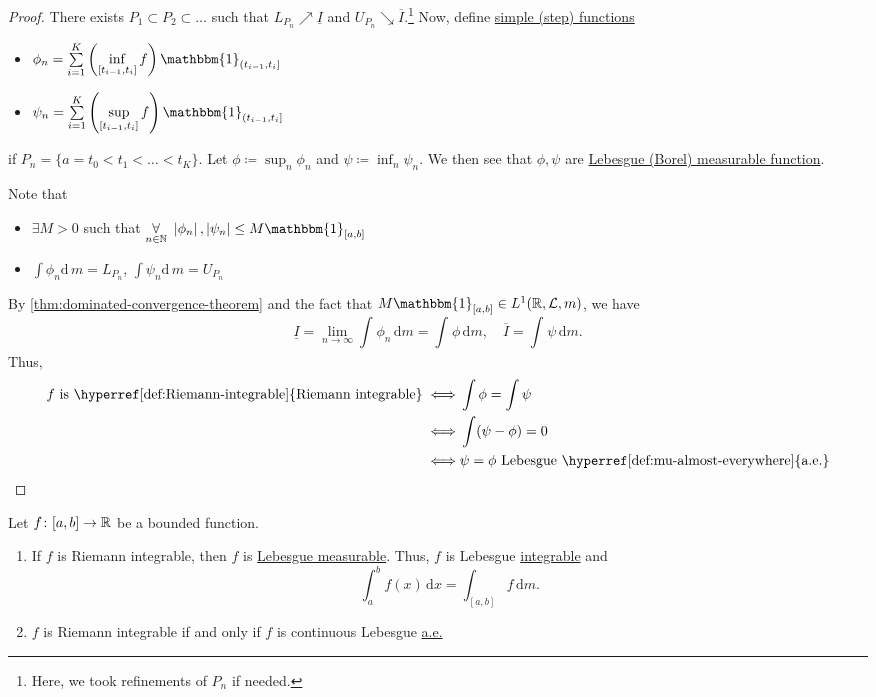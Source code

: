 \begin{proof}
	There exists \(P_1\subset P_2\subset \ldots  \) such that \(L_{P_{n}}\nearrow \underline{I} \) and \(U_{P_{n}}\searrow \overline{I} \).\footnote{Here, we took refinements of \(P_{n}\) if needed.}
	Now, define \hyperref[def:simple-function]{simple (step) functions}
	\begin{itemize}
		\item \(\phi _{n} = \sum\limits_{i=1}^{K} \left(\inf\limits_{[t_{i-1}, t_{i}]} f \right) \mathbbm{1}_{(t_{i-1}, t_{i}]} \)
		\item \(\psi _{n} = \sum\limits_{i=1}^{K} \left(\sup\limits_{[t_{i-1}, t_{i}]} f \right) \mathbbm{1}_{(t_{i-1}, t_{i}]} \)
	\end{itemize}
	if \(P_{n} = \{a = t_0 < t_1 < \ldots < t_{K} \}\). Let \(\phi \coloneqq \sup_n \phi _{n}\) and \(\psi \coloneqq \inf _n \psi _{n}\).
	We then see that \(\phi , \psi \) are \hyperref[def:measurable-function]{Lebesgue (Borel) measurable function}.
	\begin{note}
		Note that
		\begin{itemize}
			\item \(\exists M> 0\) such that \(\underset{n\in\mathbb{\MakeUppercase{n}} }{\forall }\ \left\vert \phi _{n} \right\vert, \left\vert \psi _{n} \right\vert \leq M\mathbbm{1}_{[a, b]} \)
			\item \(\int \phi _{n}\mathrm{d}\,m = L_{P_{n}}\), \(\int \psi _{n}\mathrm{d}\,m = U_{P_{n}}\)
		\end{itemize}
	\end{note}
	By \autoref{thm:dominated-convergence-theorem} and the fact that \(M\mathbbm{1}_{[a, b]} \in L^1(\mathbb{\MakeUppercase{r}} , \mathcal{\MakeUppercase{l}} , m) \),
	we have
	\[
		\underline{I} = \lim\limits_{n \to \infty} \int_{}^{} \phi _{n} \,\mathrm{d}m = \int_{}^{} \phi  \,\mathrm{d}m,\quad \overline{I}  = \int_{}^{} \psi  \,\mathrm{d}m.
	\]
	Thus,
	\[
		\begin{split}
			f \text{ is \hyperref[def:Riemann-integrable]{Riemann integrable}}
			\iff  &\int \phi = \int \psi\\
			\iff  &\int (\psi - \phi ) = 0\\
			\iff  &\psi = \phi \text{ Lebesgue \hyperref[def:mu-almost-everywhere]{a.e.}}
		\end{split}
	\]

\end{proof}

\begin{theorem}
	Let \(f\colon [a, b]\to \mathbb{\MakeUppercase{r}} \) be a bounded function.
	\begin{enumerate}
		\item If \(f\) is Riemann integrable, then \(f\) is \hyperref[def:Lebesgue-measurable-function]{Lebesgue measurable}.
		      Thus, \(f\) is Lebesgue \hyperref[def:integrable]{integrable} and
		      \[
			      \int_{a}^{b} f(x) \,\mathrm{d}x = \int_{[a, b]}f  \,\mathrm{d}m.
		      \]
		\item \(f\) is Riemann integrable if and only if \(f\) is continuous Lebesgue \hyperref[def:mu-almost-everywhere]{a.e.}
	\end{enumerate}
\end{theorem}

